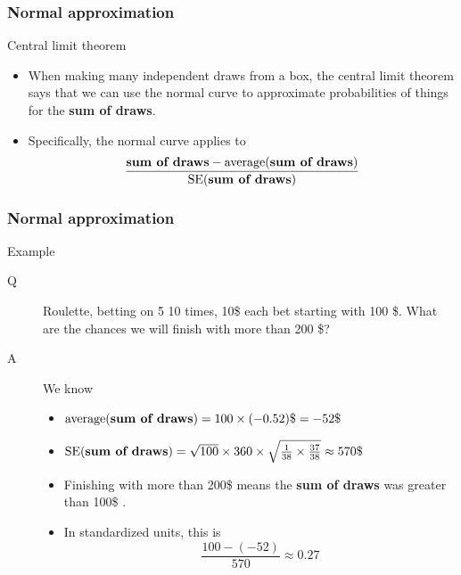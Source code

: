 \documentclass[handout]{beamer}
\begin{document}

   \begin{frame} \frametitle{Normal approximation}

   \begin{block}
   {Central limit theorem}
   \begin{itemize}
   \item When making many independent draws from a box, the central
   limit theorem says that we can use the normal curve to approximate
   probabilities of things for the {\bf sum of draws}.

   \item Specifically, the normal curve applies to
     $$
     \frac{\text{{\bf sum of draws}} - \text{average({\bf sum of draws})}}{\text{SE({\bf sum of draws})}}
     $$
   \end{itemize}
   \end{block}
   \end{frame}


   \begin{frame} \frametitle{Normal approximation}

   \begin{block}
   {Example}
   \begin{description}
   \item[Q] Roulette, betting on {\color{red} 5} 10 times, 10\$ each bet starting with 100 \$.
     What are the chances we will finish with more than 200 \$?
   \item[A] We know
     \begin{itemize}
     \item $\text{average({\bf sum of draws})} = 100 \times (-0.52)\$ = -52\$ $
     \item $\text{SE({\bf sum of draws})} = \sqrt{100} \times 360 \times \sqrt{\frac{1}{38} \times \frac{37}{38}} \approx 570\$ $
     \item Finishing with more than 200\$ means the {\bf sum of draws} was greater than 100\$ .
       \item In standardized units, this is
       $$
       \frac{100-(-52)}{570} \approx 0.27
       $$
     \end{itemize}
   \end{description}
   \end{block}
   \end{frame}
\end{document}
